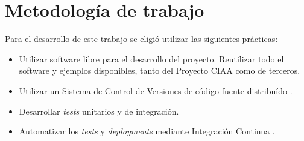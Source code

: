 \section{Metodología de trabajo}

Para el desarrollo de este trabajo se eligió utilizar las siguientes prácticas:

\begin{itemize}
    \item Utilizar software libre para el desarrollo del proyecto. Reutilizar todo el software y ejemplos disponibles, tanto del Proyecto CIAA como de terceros.
    \item Utilizar un Sistema de Control de Versiones de código fuente distribuído \citep{ControlVersionesGIT}.
    \item Desarrollar \textit{tests} unitarios y de integración.
    \item Automatizar los \textit{tests} y \textit{deployments} mediante Integración Continua \citep{IntegraciónContinuaGIT}.
\end{itemize}